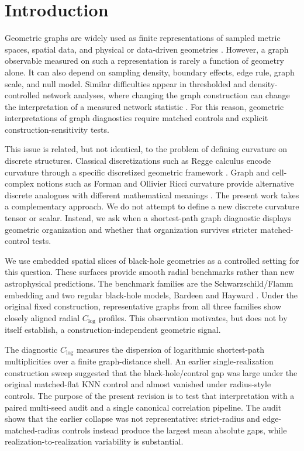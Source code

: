 \documentclass[11pt]{article}
\newcommand{\clog}{C_{\log}}
\begin{document}
\section{Introduction}

Geometric graphs are widely used as finite representations of sampled metric
spaces, spatial data, and physical or data-driven geometries
\cite{Penrose2003,DallChristensen2002,Newman2010}. However, a graph observable
measured on such a representation is rarely a function of geometry alone. It can
also depend on sampling density, boundary effects, edge rule, graph scale, and
null model. Similar difficulties appear in thresholded and density-controlled
network analyses, where changing the graph construction can change the
interpretation of a measured network statistic
\cite{VanWijk2010,Langer2013,Ginestet2011}. For this reason, geometric
interpretations of graph diagnostics require matched controls and explicit
construction-sensitivity tests.

This issue is related, but not identical, to the problem of defining curvature
on discrete structures. Classical discretizations such as Regge calculus encode
curvature through a specific discretized geometric framework \cite{Regge1961}.
Graph and cell-complex notions such as Forman and Ollivier Ricci curvature
provide alternative discrete analogues with different mathematical meanings
\cite{Forman2003,Ollivier2009}. The present work takes a complementary
approach. We do not attempt to define a new discrete curvature tensor or scalar.
Instead, we ask when a shortest-path graph diagnostic displays geometric
organization and whether that organization survives stricter matched-control
tests.

We use embedded spatial slices of black-hole geometries as a controlled setting
for this question. These surfaces provide smooth radial benchmarks rather than
new astrophysical predictions. The benchmark families are the
Schwarzschild/Flamm embedding and two regular black-hole models, Bardeen and
Hayward \cite{Schwarzschild1916,Flamm1916,Bardeen1968,Hayward2006}. Under the
original fixed construction, representative graphs from all three families show
closely aligned radial $\clog$ profiles. This observation motivates, but does
not by itself establish, a construction-independent geometric signal.

The diagnostic $\clog$ measures the dispersion of logarithmic shortest-path
multiplicities over a finite graph-distance shell. An earlier
single-realization construction sweep suggested that the black-hole/control gap
was large under the original matched-flat KNN control and almost vanished under
radius-style controls. The purpose of the present revision is to test that
interpretation with a paired multi-seed audit and a single canonical correlation
pipeline. The audit shows that the earlier collapse was not representative:
strict-radius and edge-matched-radius controls instead produce the largest mean
absolute gaps, while realization-to-realization variability is substantial.
\end{document}
